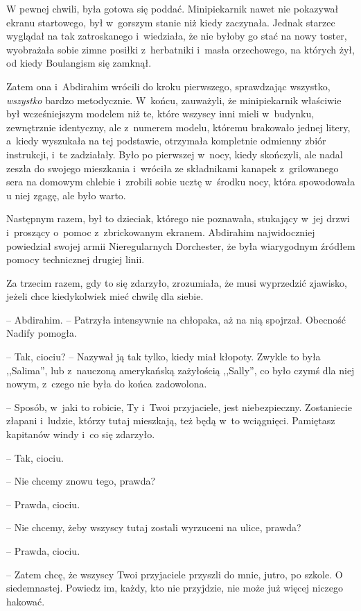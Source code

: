 \documentclass[oneside,polish,11pt,sfheadings]{mwbk}
\begin{document}
W pewnej chwili, była gotowa się poddać. Minipiekarnik nawet nie
pokazywał ekranu startowego, był w~gorszym stanie niż kiedy zaczynała.
Jednak starzec wyglądał na tak zatroskanego i~wiedziała, że nie byłoby
go stać na nowy toster, wyobrażała sobie zimne posiłki z~herbatniki i~masła orzechowego, na których żył, od kiedy Boulangism się zamknął.

Zatem ona i~Abdirahim wrócili do kroku pierwszego, sprawdzając wszystko,
\textit{wszystko} bardzo metodycznie. W~końcu, zauważyli, że minipiekarnik
właściwie był wcześniejszym modelem niż te, które wszyscy inni mieli w~budynku, zewnętrznie identyczny, ale z~numerem modelu, któremu brakowało
jednej litery, a~kiedy wyszukała na tej podstawie, otrzymała kompletnie
odmienny zbiór instrukcji, i~te zadziałały. Było po pierwszej w~nocy,
kiedy skończyli, ale nadal zeszła do swojego mieszkania i~wróciła ze
składnikami kanapek z~grilowanego sera na domowym chlebie i~zrobili
sobie ucztę w~środku nocy, która spowodowała u niej zgagę, ale było
warto.

Następnym razem, był to dzieciak, którego nie poznawała, stukający w~jej
drzwi i~proszący o~pomoc z~zbrickowanym ekranem. Abdirahim najwidoczniej
powiedział swojej armii Nieregularnych Dorchester, że była wiarygodnym
źródłem pomocy technicznej drugiej linii.

Za trzecim razem, gdy to się zdarzyło, zrozumiała, że musi wyprzedzić
zjawisko, jeżeli chce kiedykolwiek mieć chwilę dla siebie.

-- Abdirahim. -- Patrzyła intensywnie na chłopaka, aż na nią spojrzał.
Obecność Nadify pomogła.

-- Tak, ciociu? -- Nazywał ją tak tylko, kiedy miał kłopoty. Zwykle to
była ,,Salima'', lub z~nauczoną amerykańską zażyłością ,,Sally'', co
było czymś dla niej nowym, z~czego nie była do końca zadowolona.

-- Sposób, w~jaki to robicie, Ty i~Twoi przyjaciele, jest niebezpieczny.
Zostaniecie złapani i~ludzie, którzy tutaj mieszkają, też będą w~to
wciągnięci. Pamiętasz kapitanów windy i~co się zdarzyło.

-- Tak, ciociu.

-- Nie chcemy znowu tego, prawda?

-- Prawda, ciociu.

-- Nie chcemy, żeby wszyscy tutaj zostali wyrzuceni na ulice, prawda?

-- Prawda, ciociu.

-- Zatem chcę, że wszyscy Twoi przyjaciele przyszli do mnie, jutro, po
szkole. O siedemnastej. Powiedz im, każdy, kto nie przyjdzie, nie może
już więcej niczego hakować.
\end{document}
